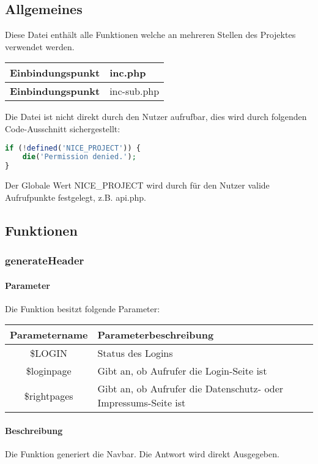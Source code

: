\subsection{Allgemeines} Diese Datei enthält alle Funktionen welche an mehreren Stellen des Projektes verwendet werden.
\begin{table}[H]
	\begin{tabular}{|c|p{11cm}|}
		\hline
		\textbf{Einbindungspunkt} & inc.php \\ \hline
		\textbf{Einbindungspunkt} & inc-sub.php \\ \hline
	\end{tabular}
\end{table}
Die Datei ist nicht direkt durch den Nutzer aufrufbar, dies wird durch folgenden Code-Ausschnitt sichergestellt:
\begin{lstlisting}[language=php]
if (!defined('NICE_PROJECT')) {
	die('Permission denied.');
}
\end{lstlisting}
Der Globale Wert {\glqq NICE\_PROJECT\grqq} wird durch für den Nutzer valide Aufrufpunkte festgelegt, z.B. {\glqq api.php\grqq}.
\newpage
\subsection{Funktionen}
\subsubsection{generateHeader}
\paragraph{Parameter} Die Funktion besitzt folgende Parameter:
\begin{table}[H]
	\begin{tabular}{|c|p{11cm}|}
		\hline
		\textbf{Parametername} & \textbf{Parameterbeschreibung} \\ \hline
		\$LOGIN      & Status des Logins \\ \hline
		\$loginpage  & Gibt an, ob Aufrufer die Login-Seite ist \\ \hline
		\$rightpages & Gibt an, ob Aufrufer die Datenschutz- oder Impressums-Seite ist \\ \hline
	\end{tabular}
\end{table}
\paragraph{Beschreibung} Die Funktion generiert die Navbar. Die Antwort wird direkt Ausgegeben.

